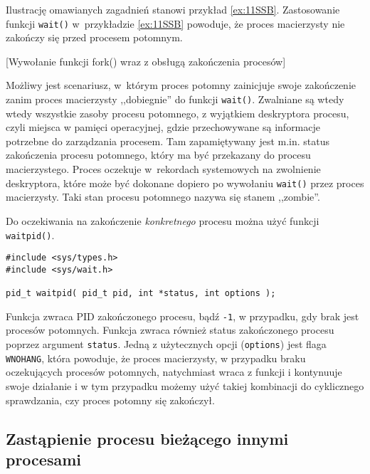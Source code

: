 Ilustrację omawianych zagadnień stanowi przykład \ref{ex:11SSB}. Zastosowanie
funkcji \texttt{wait()} w~przykładzie \ref{ex:11SSB} powoduje, że proces
macierzysty nie zakończy się przed procesem potomnym.
\begin{example}{[Wywołanie funkcji fork() wraz z obsługą zakończenia procesów]}
  \label{ex:11SSB}
  
\end{example}

Możliwy jest scenariusz, w~którym proces potomny zainicjuje swoje zakończenie
zanim proces macierzysty ,,dobiegnie'' do funkcji \texttt{wait()}. Zwalniane są
wtedy wtedy wszystkie zasoby procesu potomnego, z wyjątkiem deskryptora
procesu, czyli miejsca w pamięci operacyjnej, gdzie przechowywane są informacje
potrzebne do zarządzania procesem. Tam zapamiętywany jest m.in. status
zakończenia procesu potomnego, który ma być przekazany do procesu
macierzystego. Proces oczekuje w~rekordach systemowych na zwolnienie
deskryptora, które może być dokonane dopiero po wywołaniu \texttt{wait()} przez
proces macierzysty. Taki stan procesu potomnego nazywa się stanem ,,zombie''.

Do oczekiwania na zakończenie \textit{konkretnego} procesu można użyć funkcji
\texttt{waitpid()}.
\begin{lstlisting}[style=MyCStyle]
#include <sys/types.h>
#include <sys/wait.h>

pid_t waitpid( pid_t pid, int *status, int options );
\end{lstlisting}
Funkcja zwraca PID zakończonego procesu, bądź \texttt{-1}, w przypadku, gdy
brak jest procesów potomnych. Funkcja zwraca również status zakończonego
procesu poprzez argument \texttt{status}. Jedną z użytecznych opcji
(\texttt{options}) jest flaga \texttt{WNOHANG}, która powoduje, że proces
macierzysty, w przypadku braku oczekujących procesów potomnych, natychmiast
wraca z funkcji i kontynuuje swoje działanie i w tym przypadku możemy użyć
takiej kombinacji do cyklicznego sprawdzania, czy proces potomny się zakończył.


\subsection{Zastąpienie procesu bieżącego innymi procesami}

